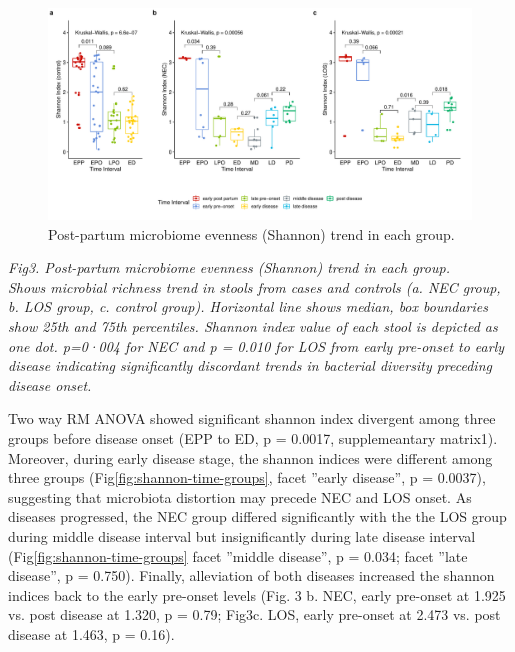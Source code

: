 \documentclass[fleqn,10pt]{wlpeerj} %
\begin{document}
    \begin{figure}[ht]\centering
      \includegraphics[width=\linewidth]{figure/shannon-group-time2.pdf}
      \caption{Post-partum microbiome evenness (Shannon) trend in each group.}
      \label{fig:shannon-group-time}
    \end{figure}

    \textit{Fig3. Post-partum microbiome evenness (Shannon) trend in each group. \\ Shows microbial richness trend in stools from cases and controls (a. NEC group, b. LOS group, c. control group). Horizontal line shows median, box boundaries show 25th and 75th percentiles.  Shannon index value of each stool is depicted as one dot. p=0·004 for NEC and p = 0.010 for LOS from early pre-onset to early disease indicating significantly discordant trends in bacterial diversity preceding disease onset. }

    Two way RM ANOVA showed significant shannon index divergent among three groups before disease onset (EPP to ED, p = 0.0017, supplemeantary matrix1). Moreover, during early disease stage, the shannon indices were different among three groups (Fig\ref{fig:shannon-time-groups}, facet ”early disease”, p = 0.0037), suggesting that microbiota distortion may precede NEC and LOS onset. As diseases progressed, the NEC group differed significantly with the the LOS group during middle disease interval but insignificantly  during late disease interval (Fig\ref{fig:shannon-time-groups} facet ”middle disease”, p = 0.034; facet ”late disease”, p = 0.750). Finally, alleviation of both diseases increased the shannon indices back to the early pre-onset levels (Fig. 3 b. NEC, early pre-onset at 1.925 vs. post disease at 1.320, p = 0.79; Fig3c. LOS, early pre-onset at 2.473 vs. post disease at 1.463, p = 0.16).
\end{document}
